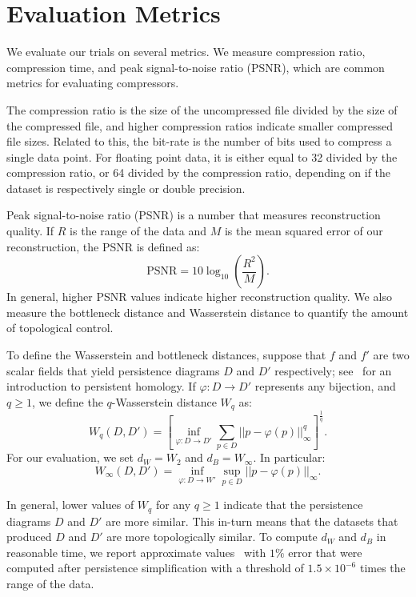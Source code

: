\section{Evaluation Metrics}
\label{sec:evaluationMetrics}

We evaluate our trials on several metrics. We measure compression ratio, compression time, and peak signal-to-noise ratio (PSNR), which are common metrics for evaluating compressors. 

The compression ratio is the size of the uncompressed file divided by the size of the compressed file, and higher compression ratios indicate smaller compressed file sizes. Related to this, the bit-rate is the number of bits used to compress a single data point. For floating point data, it is either equal to 32 divided by the compression ratio, or 64 divided by the compression ratio, depending on if the dataset is respectively single or double precision.

Peak signal-to-noise ratio (PSNR) is a number that measures reconstruction quality. If $R$ is the range of the data and $M$ is the mean squared error of our reconstruction, the PSNR is defined as:
\begin{equation}
  \label{eq:psnr}
  \text{PSNR} = 10 \log_{10}\left( \frac{ R^2 }{ M } \right).
\end{equation}
In general, higher PSNR values indicate higher reconstruction quality. We also measure the bottleneck distance \cite{cohen2005stability} and Wasserstein distance \cite[page 183]{edelsbrunner2022computational} to quantify the amount of topological control.

To define the Wasserstein and bottleneck distances, suppose that $f$ and $f'$ are two scalar fields that yield persistence diagrams $D$ and $D'$ respectively; see~\cite{EdelsbrunnerLetscherZomorodian2002} for an introduction to persistent homology. If $\varphi:D \rightarrow D'$ represents any bijection, and $q \geq 1$, we define the $q$-Wasserstein distance $W_q$ as:
\begin{equation}
W_q(D,D') = \left[ \inf_{\varphi:D\rightarrow D'} \sum_{p \in D} || p - \varphi(p)||_\infty^q \right]^{\frac{1}{q}}.
\end{equation}
For our evaluation, we set $d_W = W_2$ and $d_B = W_\infty$. In particular:
\begin{equation}
W_\infty(D,D') = \inf_{\varphi:D \rightarrow W'} \sup_{p \in D} ||p- \varphi(p)||_\infty. 
\end{equation}

In general, lower values of $W_q$ for any $q \geq 1$ indicate that the persistence diagrams $D$ and $D'$ are more similar. This in-turn means that the datasets that produced $D$ and $D'$ are more topologically similar. To compute $d_W$ and $d_B$ in reasonable time, we report approximate values~\cite{KerberMorozovNigmetov2016} with $1\%$ error that were computed after persistence simplification with a threshold of $1.5 \times 10^{-6}$ times the range of the data.